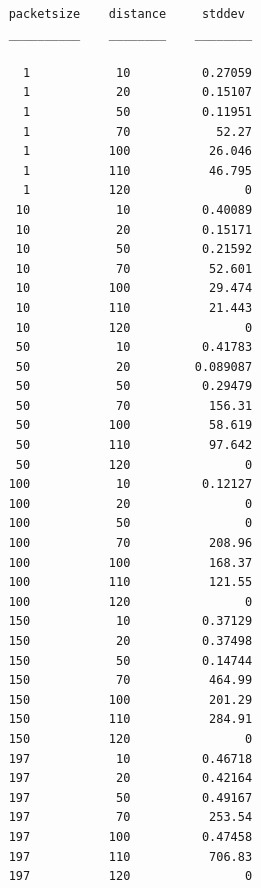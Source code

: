 \begin{verbatim}
    packetsize    distance     stddev 
    __________    ________    ________

      1            10          0.27059
      1            20          0.15107
      1            50          0.11951
      1            70            52.27
      1           100           26.046
      1           110           46.795
      1           120                0
     10            10          0.40089
     10            20          0.15171
     10            50          0.21592
     10            70           52.601
     10           100           29.474
     10           110           21.443
     10           120                0
     50            10          0.41783
     50            20         0.089087
     50            50          0.29479
     50            70           156.31
     50           100           58.619
     50           110           97.642
     50           120                0
    100            10          0.12127
    100            20                0
    100            50                0
    100            70           208.96
    100           100           168.37
    100           110           121.55
    100           120                0
    150            10          0.37129
    150            20          0.37498
    150            50          0.14744
    150            70           464.99
    150           100           201.29
    150           110           284.91
    150           120                0
    197            10          0.46718
    197            20          0.42164
    197            50          0.49167
    197            70           253.54
    197           100          0.47458
    197           110           706.83
    197           120                0
\end{verbatim}